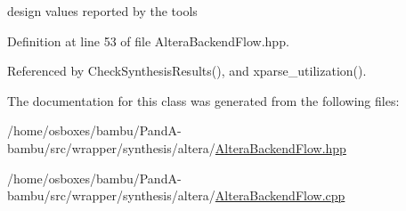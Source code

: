 design values reported by the tools 



Definition at line 53 of file Altera\+Backend\+Flow.\+hpp.



Referenced by Check\+Synthesis\+Results(), and xparse\+\_\+utilization().



The documentation for this class was generated from the following files\+:\begin{DoxyCompactItemize}
\item 
/home/osboxes/bambu/\+Pand\+A-\/bambu/src/wrapper/synthesis/altera/\hyperlink{AlteraBackendFlow_8hpp}{Altera\+Backend\+Flow.\+hpp}\item 
/home/osboxes/bambu/\+Pand\+A-\/bambu/src/wrapper/synthesis/altera/\hyperlink{AlteraBackendFlow_8cpp}{Altera\+Backend\+Flow.\+cpp}\end{DoxyCompactItemize}
